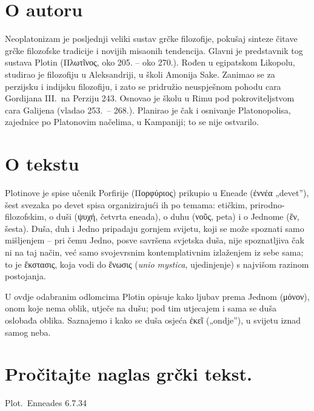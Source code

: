 \section*{O autoru}

Neoplatonizam je posljednji veliki sustav grčke filozofije, pokušaj sinteze čitave grčke filozofske tradicije i novijih misaonih tendencija. Glavni je predstavnik tog sustava Plotin \textgreek[variant=ancient]{(Πλωτῖνος,} oko 205. – oko 270.). Rođen u egipatskom Likopolu, studirao je filozofiju u Aleksandriji, u školi Amonija Sake. Zanimao se za perzijsku i indijsku filozofiju, i zato se pridružio neuspješnom pohodu cara Gordijana III.\ na Perziju 243. Osnovao je školu u Rimu pod pokroviteljstvom cara Galijena (vladao 253.\ – 268.). Planirao je čak i osnivanje Platonopolisa, zajednice po Platonovim načelima, u Kampaniji; to se nije ostvarilo.

\section*{O tekstu}

Plotinove je spise učenik Porfirije \textgreek[variant=ancient]{(Πορφύριος)} prikupio u Eneade \textgreek[variant=ancient]{(ἐννέα} „devet''), šest svezaka po devet spisa organizirajući ih po temama: etičkim, prirodno-filozofskim, o duši \textgreek[variant=ancient]{(ψυχή,} četvrta eneada), o duhu \textgreek[variant=ancient]{(νοῦς,} peta) i o Jednome \textgreek[variant=ancient]{(ἕν,} šesta). Duša, duh i Jedno pripadaju gornjem svijetu, koji se može spoznati samo mišljenjem – pri čemu Jedno, posve savršena svjetska duša, nije spoznatljiva čak ni na taj način, već samo svojevrsnim kontemplativnim izlaženjem iz sebe sama; to je ἔκστασις, koja vodi do ἕνωσις (\textit{unio mystica}, ujedinjenje) s najvišom razinom postojanja.

U ovdje odabranim odlomcima Plotin opisuje kako ljubav prema Jednom \textgreek[variant=ancient]{(μόνον),} onom koje nema oblik, utječe na dušu; pod tim utjecajem i sama se duša oslobađa oblika. Saznajemo i kako se duša osjeća \textgreek[variant=ancient]{ἐκεῖ} („ondje''), u svijetu iznad samog neba.

\section*{Pročitajte naglas grčki tekst.}

Plot.\ Enneades 6.7.34


